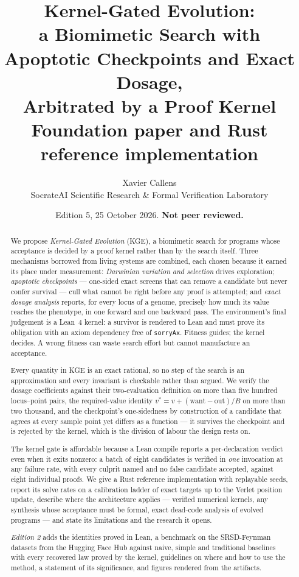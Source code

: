 \documentclass[11pt,a4paper]{article}
\title{\textbf{Kernel-Gated Evolution:\\
a Biomimetic Search with Apoptotic Checkpoints and Exact Dosage,\\
Arbitrated by a Proof Kernel}\\[0.6em]
\large Foundation paper and Rust reference implementation}
\author{Xavier Callens\\
\small SocrateAI Scientific Research \& Formal Verification Laboratory}
\date{Edition 5, 25 October 2026. \textbf{Not peer reviewed.}}
\theoremstyle{definition}
\theoremstyle{remark}
\begin{document}
\maketitle

\begin{abstract}
We propose \emph{Kernel-Gated Evolution} (KGE), a biomimetic search for
programs whose acceptance is decided by a proof kernel rather than by the search
itself. Three mechanisms borrowed from living systems are combined, each chosen
because it earned its place under measurement: \emph{Darwinian variation and
selection} drives exploration; \emph{apoptotic checkpoints} --- one-sided exact
screens that can remove a candidate but never confer survival --- cull what
cannot be right before any proof is attempted; and \emph{exact dosage analysis}
reports, for every locus of a genome, precisely how much its value reaches the
phenotype, in one forward and one backward pass. The environment's final
judgement is a Lean~4 kernel: a survivor is rendered to Lean and must prove its
obligation with an axiom dependency free of \texttt{sorryAx}. Fitness guides;
the kernel decides. A wrong fitness can waste search effort but cannot
manufacture an acceptance.

Every quantity in KGE is an exact rational, so no step of the search is an
approximation and every invariant is checkable rather than argued. We verify the
dosage coefficients against their two-evaluation definition on more than five
hundred locus--point pairs, the required-value identity $v^* = v + (\text{want} -
\text{out})/B$ on more than two thousand, and the checkpoint's one-sidedness by
construction of a candidate that agrees at every sample point yet differs as a
function --- it survives the checkpoint and is rejected by the kernel, which is
the division of labour the design rests on.

The kernel gate is affordable because a Lean compile reports a per-declaration
verdict even when it exits nonzero: a batch of eight candidates is verified in
\emph{one} invocation at any failure rate, with every culprit named and no false
candidate accepted, against eight individual proofs. We give a Rust reference
implementation with replayable seeds, report its solve rates on a calibration
ladder of exact targets up to the Verlet position update, describe where the
architecture applies --- verified numerical kernels, any synthesis whose
acceptance must be formal, exact dead-code analysis of evolved programs --- and
state its limitations and the research it opens.

\emph{Edition 2} adds the identities proved in Lean, a benchmark on the
SRSD-Feynman datasets from the Hugging Face Hub against naive, simple and
traditional baselines with every recovered law proved by the kernel, guidelines
on where and how to use the method, a statement of its significance, and figures
rendered from the artifacts.
\end{abstract}
\end{document}

